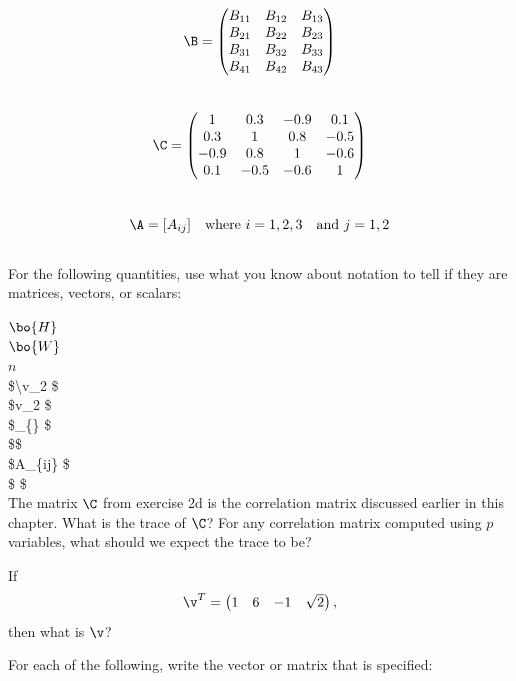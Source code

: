 \documentclass[
]{article}
\theoremstyle{definition}
\theoremstyle{definition}
\theoremstyle{definition}
\theoremstyle{definition}
\theoremstyle{remark}
\begin{document}
\[\B=\left(\begin{matrix}   B_{11}&B_{12}&B_{13}\\B_{21}&B_{22}&B_{23}\\B_{31}&B_{32}&B_{33}\\B_{41}&B_{42}&B_{43}\end{matrix}\right)\]\\

\[\C=\left(\begin{matrix} 1 & 0.3 & -0.9 & 0.1\\0.3 & 1 & 0.8 & -0.5\\-0.9&0.8&1&-0.6\\0.1&-0.5&-0.6&1 \end{matrix}\right)\]\\

\[\A = [A_{ij}] \quad \mbox{where } i=1,2,3 \quad \mbox{and   } j=1,2\]\\

For the following quantities, use what you know about notation to tell if they are matrices, vectors, or scalars:

\(\bo{H}\)\\

\(\bo{W}\)\\

\(n\)\\

\$\textbackslash v\_2 \$\\

\$v\_2 \$\\

\$\_\{\} \$\\

\$\lambda \$\\

\$A\_\{ij\} \$\\

\$ \$\\

The matrix \(\C\) from exercise 2d is the correlation matrix discussed earlier in this chapter. What is the trace of \(\C\)? For any correlation matrix computed using \(p\) variables, what should we expect the trace to be?

If \[\v^T = \left(\begin{matrix} 1&6&-1&\sqrt{2} \end{matrix}\right),\] then what is \(\v\)?

For each of the following, write the vector or matrix that is specified:
\end{document}
